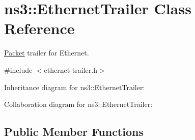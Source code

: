 \hypertarget{classns3_1_1EthernetTrailer}{}\section{ns3\+:\+:Ethernet\+Trailer Class Reference}
\label{classns3_1_1EthernetTrailer}


\hyperlink{classns3_1_1Packet}{Packet} trailer for Ethernet.  




{\ttfamily \#include $<$ethernet-\/trailer.\+h$>$}



Inheritance diagram for ns3\+:\+:Ethernet\+Trailer\+:


Collaboration diagram for ns3\+:\+:Ethernet\+Trailer\+:
\subsection*{Public Member Functions}

